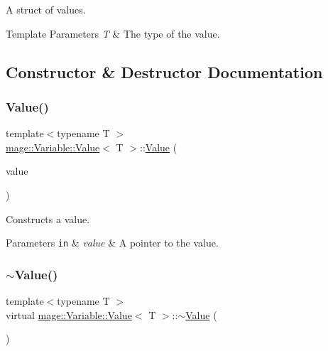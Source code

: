 A struct of values. 
\begin{DoxyTemplParams}{Template Parameters}
{\em T} & The type of the value. \\
\hline
\end{DoxyTemplParams}


\subsection{Constructor \& Destructor Documentation}
\hypertarget{structmage_1_1_variable_1_1_value_a1e29cc5eaeb8356a11a1eca0232cf162}{}\label{structmage_1_1_variable_1_1_value_a1e29cc5eaeb8356a11a1eca0232cf162} 
\subsubsection{\texorpdfstring{Value()}{Value()}}
{\footnotesize\ttfamily template$<$typename T $>$ \\
\hyperlink{structmage_1_1_variable_1_1_value}{mage\+::\+Variable\+::\+Value}$<$ T $>$\+::\hyperlink{structmage_1_1_variable_1_1_value}{Value} (\begin{DoxyParamCaption}\item[{const T $\ast$}]{value }\end{DoxyParamCaption})}

Constructs a value.


\begin{DoxyParams}[1]{Parameters}
\mbox{\tt in}  & {\em value} & A pointer to the value. \\
\hline
\end{DoxyParams}
\hypertarget{structmage_1_1_variable_1_1_value_ab0b88d59c1049b89557fbaf649a3b459}{}\label{structmage_1_1_variable_1_1_value_ab0b88d59c1049b89557fbaf649a3b459} 
\subsubsection{\texorpdfstring{$\sim$\+Value()}{~Value()}}
{\footnotesize\ttfamily template$<$typename T $>$ \\
virtual \hyperlink{structmage_1_1_variable_1_1_value}{mage\+::\+Variable\+::\+Value}$<$ T $>$\+::$\sim$\hyperlink{structmage_1_1_variable_1_1_value}{Value} (\begin{DoxyParamCaption}{ }\end{DoxyParamCaption})\hspace{0.3cm}{\ttfamily [virtual]}}

